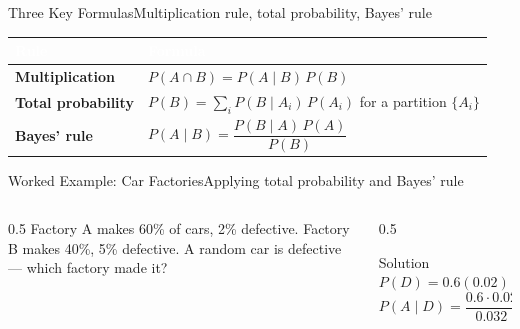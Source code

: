 \documentclass[aspectratio=169,11pt]{beamer}
\begin{document}
\begin{frame}{Three Key Formulas}{Multiplication rule, total probability, Bayes' rule}
  \small
  \renewcommand{\arraystretch}{1.35}
  \begin{center}
  \begin{tabularx}{\textwidth}{@{}>{\bfseries}l >{\raggedright\arraybackslash}X@{}}
    \toprule
    \rowcolor{PrimaryDark}
    \textcolor{white}{Rule} & \textcolor{white}{Formula} \\
    \midrule
    Multiplication & $P(A\cap B) = P(A\mid B)\,P(B)$ \\
    \rowcolor{PrimaryLight!25}
    Total probability & $P(B) = \sum_i P(B\mid A_i)\,P(A_i)$ for a partition $\{A_i\}$ \\
    Bayes' rule & $P(A\mid B) = \dfrac{P(B\mid A)\,P(A)}{P(B)}$ \\
    \bottomrule
  \end{tabularx}
  \end{center}
\end{frame}

\begin{frame}{Worked Example: Car Factories}{Applying total probability and Bayes' rule}
  \begin{columns}[T]
    \begin{column}{0.5\textwidth}
      \small Factory A makes 60\% of cars, 2\% defective. Factory B makes
      40\%, 5\% defective. A random car is defective — which factory made
      it?
    \end{column}
    \begin{column}{0.5\textwidth}
      \begin{exampleblock}{Solution}
        \small $P(D) = 0.6(0.02)+0.4(0.05) = 0.032$
        \[ P(A\mid D) = \frac{0.6\cdot0.02}{0.032} = 0.375 \]
      \end{exampleblock}
    \end{column}
  \end{columns}
\end{frame}
\end{document}
